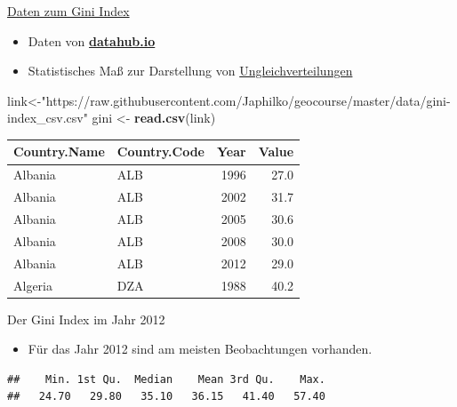 \documentclass[ignorenonframetext,]{beamer}
\newenvironment{Shaded}{\begin{snugshade}}{\end{snugshade}}
\newcommand{\DecValTok}[1]{\textcolor[rgb]{0.00,0.00,0.81}{#1}}
\newcommand{\KeywordTok}[1]{\textcolor[rgb]{0.13,0.29,0.53}{\textbf{#1}}}
\newcommand{\NormalTok}[1]{#1}
\newcommand{\OperatorTok}[1]{\textcolor[rgb]{0.81,0.36,0.00}{\textbf{#1}}}
\newcommand{\StringTok}[1]{\textcolor[rgb]{0.31,0.60,0.02}{#1}}
\providecommand{\tightlist}{%
  \setlength{\itemsep}{0pt}\setlength{\parskip}{0pt}}
\begin{document}
\begin{frame}[fragile]{\href{https://datahub.io/core/gini-index\#data}{Daten
zum Gini Index}}
\protect\hypertarget{daten-zum-gini-index}{}

\begin{itemize}
\tightlist
\item
  Daten von
  \href{https://datahub.io/core/gini-index\#data}{\textbf{datahub.io}}
\item
  Statistisches Maß zur Darstellung von
  \href{https://de.wikipedia.org/wiki/Gini-Koeffizient}{Ungleichverteilungen}
\end{itemize}

\begin{Shaded}
\begin{Highlighting}[]
\NormalTok{link<-}\StringTok{"https://raw.githubusercontent.com/Japhilko/geocourse/master/data/gini-index_csv.csv"}
\NormalTok{gini <-}\StringTok{ }\KeywordTok{read.csv}\NormalTok{(link)}
\end{Highlighting}
\end{Shaded}

\begin{longtable}[]{@{}llrr@{}}
\toprule
Country.Name & Country.Code & Year & Value\tabularnewline
\midrule
\endhead
Albania & ALB & 1996 & 27.0\tabularnewline
Albania & ALB & 2002 & 31.7\tabularnewline
Albania & ALB & 2005 & 30.6\tabularnewline
Albania & ALB & 2008 & 30.0\tabularnewline
Albania & ALB & 2012 & 29.0\tabularnewline
Algeria & DZA & 1988 & 40.2\tabularnewline
\bottomrule
\end{longtable}

\end{frame}

\begin{frame}[fragile]{Der Gini Index im Jahr 2012}
\protect\hypertarget{der-gini-index-im-jahr-2012}{}

\begin{itemize}
\tightlist
\item
  Für das Jahr 2012 sind am meisten Beobachtungen vorhanden.
\end{itemize}

\begin{Shaded}
\end{Shaded}

\begin{verbatim}
##    Min. 1st Qu.  Median    Mean 3rd Qu.    Max. 
##   24.70   29.80   35.10   36.15   41.40   57.40
\end{verbatim}

\end{frame}
\end{document}
